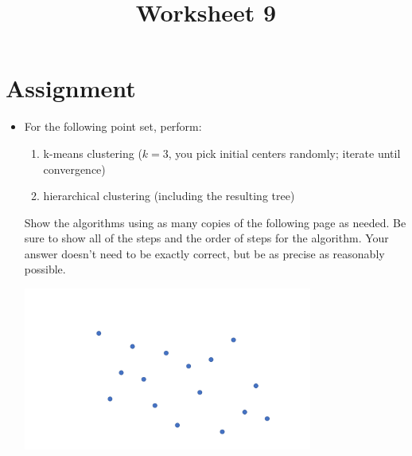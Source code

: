 \documentclass[a4paper,12pt]{article}
\title{Worksheet 9}
\begin{document}
\maketitle

\worksheetGroundRules


\vspace{5pt}
\section{Assignment}

\begin{itemize}



\item For the following point set, perform:
\begin{enumerate}
\item k-means clustering ($k=3$, you pick initial centers randomly; iterate until convergence)
\item hierarchical clustering (including the resulting tree)
\end{enumerate}
Show the algorithms using as many copies of the following page as needed. Be sure to show all of the steps and the order of steps for the algorithm. Your answer doesn't need to be exactly correct, but be as precise as reasonably possible.

\begin{center}
\includegraphics[width=9.5cm]{../images/spatial_subd.pdf}
\end{center}



\end{itemize}


\worksheetSubmission




\newpage
\end{document}
